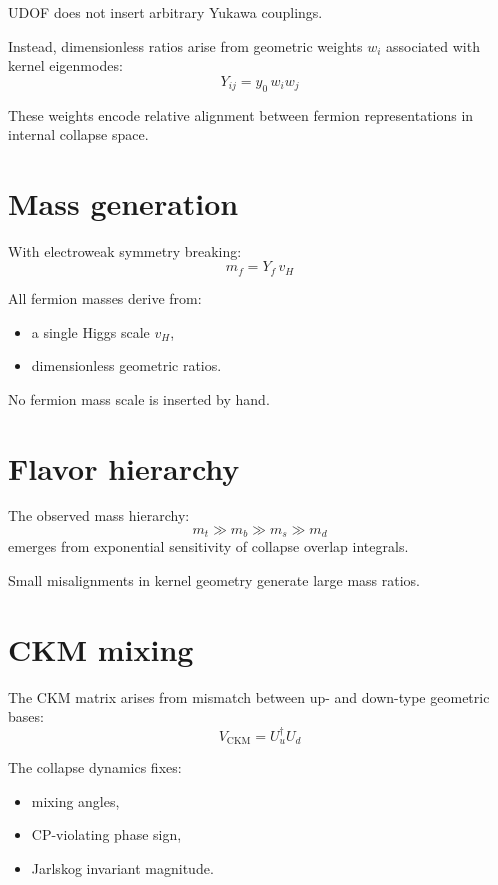 \documentclass[11pt]{book}
\begin{document}
UDOF does not insert arbitrary Yukawa couplings.

Instead, dimensionless ratios arise from geometric weights $w_i$
associated with kernel eigenmodes:
\begin{equation}
Y_{ij} = y_0 \, w_i w_j
\end{equation}

These weights encode relative alignment between fermion representations
in internal collapse space.

\section{Mass generation}

With electroweak symmetry breaking:
\begin{equation}
m_f = Y_f \, v_H
\end{equation}

All fermion masses derive from:
\begin{itemize}
\item a single Higgs scale $v_H$,
\item dimensionless geometric ratios.
\end{itemize}

No fermion mass scale is inserted by hand.

\section{Flavor hierarchy}

The observed mass hierarchy:
\begin{equation}
m_t \gg m_b \gg m_s \gg m_d
\end{equation}
emerges from exponential sensitivity of collapse overlap integrals.

Small misalignments in kernel geometry generate large mass ratios.

\section{CKM mixing}

The CKM matrix arises from mismatch between up- and down-type
geometric bases:
\begin{equation}
V_{\mathrm{CKM}} = U_u^\dagger U_d
\end{equation}

The collapse dynamics fixes:
\begin{itemize}
\item mixing angles,
\item CP-violating phase sign,
\item Jarlskog invariant magnitude.
\end{itemize}
\end{document}
